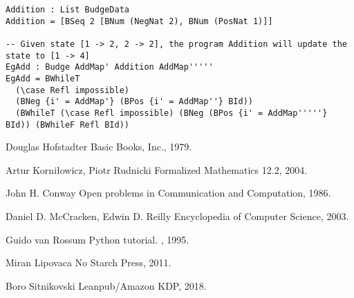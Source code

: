 \documentclass{article}
\begin{document}
\begin{lstlisting}
Addition : List BudgeData
Addition = [BSeq 2 [BNum (NegNat 2), BNum (PosNat 1)]]

-- Given state [1 -> 2, 2 -> 2], the program Addition will update the state to [1 -> 4]
EgAdd : Budge AddMap' Addition AddMap'''''
EgAdd = BWhileT
  (\case Refl impossible)
  (BNeg {i' = AddMap'} (BPos {i' = AddMap''} BId))
  (BWhileT (\case Refl impossible) (BNeg (BPos {i' = AddMap'''''} BId)) (BWhileF Refl BId))
\end{lstlisting}

\begin{thebibliography}{1}

Douglas Hofstadter
\newblock Basic Books, Inc., 1979.

Artur Korniłowicz, Piotr Rudnicki
\newblock Formalized Mathematics 12.2, 2004.

John H. Conway
\newblock Open problems in Communication and Computation, 1986.

Daniel D. McCracken, Edwin D. Reilly
\newblock Encyclopedia of Computer Science, 2003.

Guido van Rossum
\newblock Python tutorial.
, 1995.

Miran Lipovaca
\newblock No Starch Press, 2011.

Boro Sitnikovski
\newblock Leanpub/Amazon KDP, 2018.

\end{thebibliography}
\end{document}
